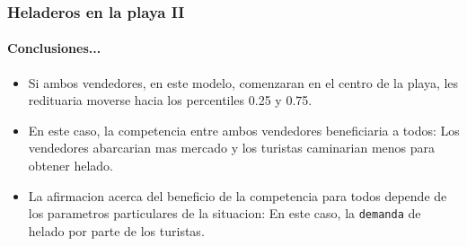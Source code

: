 \documentclass{beamer}
\begin{document}
\begin{frame}
  \frametitle{Heladeros en la playa II}
  \framesubtitle{Conclusiones...}
  \begin{itemize}
    \setlength{\itemsep}{4pt}
    \item Si ambos vendedores, en este modelo, comenzaran en el centro de la playa, les redituaria moverse hacia los percentiles 0.25 y 0.75.
    \pause
    \item En este caso, la competencia entre ambos vendedores beneficiaria a todos: Los vendedores abarcarian mas mercado y los turistas caminarian menos para obtener helado.
    \pause
    \item La afirmacion acerca del beneficio de la competencia para todos depende de los parametros particulares de la situacion: En este caso, la \texttt{demanda} de helado por parte de los turistas. 
  \end{itemize}
\end{frame}
\end{document}
